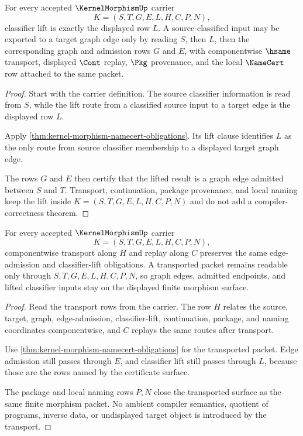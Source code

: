 \begin{theorem}
\label{thm:kernel-morphism-classifier-lift-obligation}
For every accepted $\KernelMorphismUp$ carrier
$$
K=(S,T,G,E,L,H,C,P,N),
$$
classifier lift is exactly the displayed row $L$. A source-classified input may be exported to a target graph edge only by reading $S$, then $L$, then the corresponding graph and admission rows $G$ and $E$, with componentwise $\hsame$ transport, displayed $\Cont$ replay, $\Pkg$ provenance, and the local $\NameCert$ row attached to the same packet.
\end{theorem}
\begin{proof}
Start with the carrier definition. The source classifier information is read from $S$, while the lift route from a classified source input to a target edge is the displayed row $L$.

Apply \autoref{thm:kernel-morphism-namecert-obligations}. Its lift clause identifies $L$ as the only route from source classifier membership to a displayed target graph edge.

The rows $G$ and $E$ then certify that the lifted result is a graph edge admitted between $S$ and $T$. Transport, continuation, package provenance, and local naming keep the lift inside $K=(S,T,G,E,L,H,C,P,N)$ and do not add a compiler-correctness theorem.
\end{proof}

\begin{theorem}
\label{thm:kernel-morphism-transport-stability-obligation}
For every accepted $\KernelMorphismUp$ carrier
$$
K=(S,T,G,E,L,H,C,P,N),
$$
componentwise transport along $H$ and replay along $C$ preserves the same edge-admission and classifier-lift obligations. A transported packet remains readable only through $S,T,G,E,L,H,C,P,N$, so graph edges, admitted endpoints, and lifted classifier inputs stay on the displayed finite morphism surface.
\end{theorem}
\begin{proof}
Read the transport rows from the carrier. The row $H$ relates the source, target, graph, edge-admission, classifier-lift, continuation, package, and naming coordinates componentwise, and $C$ replays the same routes after transport.

Use \autoref{thm:kernel-morphism-namecert-obligations} for the transported packet. Edge admission still passes through $E$, and classifier lift still passes through $L$, because those are the rows named by the certificate surface.

The package and local naming rows $P,N$ close the transported surface as the same finite morphism packet. No ambient compiler semantics, quotient of programs, inverse data, or undisplayed target object is introduced by the transport.
\end{proof}

